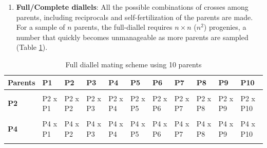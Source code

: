 \documentclass[11pt,dvipsnames,ignorenonframetext,aspectratio=169]{beamer}
\providecommand{\tightlist}{%
  \setlength{\itemsep}{0pt}\setlength{\parskip}{0pt}}
\begin{document}
\begin{frame}{}
\protect\hypertarget{section-7}{}
\begin{enumerate}
\tightlist
\item
  \textbf{Full/Complete diallels}: All the possible combinations of
  crosses among parents, including reciprocals and self-fertilization of
  the parents are made. For a sample of \(n\) parents, the full-diallel
  requires \(n \times n\) (\(n^2\)) progenies, a number that quickly
  becomes unmanageable as more parents are sampled (Table
  \ref{tab:full-diallel}).
\end{enumerate}

\begingroup\fontsize{8}{10}\selectfont

\begin{longtable}[t]{>{\raggedright\arraybackslash}p{3.0em}>{\raggedright\arraybackslash}p{3.0em}>{\raggedright\arraybackslash}p{3.0em}>{\raggedright\arraybackslash}p{3.0em}>{\raggedright\arraybackslash}p{3.0em}>{\raggedright\arraybackslash}p{3.0em}>{\raggedright\arraybackslash}p{3.0em}>{\raggedright\arraybackslash}p{3.0em}>{\raggedright\arraybackslash}p{3.0em}>{\raggedright\arraybackslash}p{3.0em}>{\raggedright\arraybackslash}p{3.5em}}
\caption{\label{tab:full-diallel}Full diallel mating scheme using 10 parents}\\
\toprule
Parents & P1 & P2 & P3 & P4 & P5 & P6 & P7 & P8 & P9 & P10\\
\midrule
\textbf{\cellcolor{gray!6}{P1}} & \cellcolor{gray!6}{P1 x P1} & \cellcolor{gray!6}{P1 x P2} & \cellcolor{gray!6}{P1 x P3} & \cellcolor{gray!6}{P1 x P4} & \cellcolor{gray!6}{P1 x P5} & \cellcolor{gray!6}{P1 x P6} & \cellcolor{gray!6}{P1 x P7} & \cellcolor{gray!6}{P1 x P8} & \cellcolor{gray!6}{P1 x P9} & \cellcolor{gray!6}{P1 x P10}\\
\textbf{P2} & P2 x P1 & P2 x P2 & P2 x P3 & P2 x P4 & P2 x P5 & P2 x P6 & P2 x P7 & P2 x P8 & P2 x P9 & P2 x P10\\
\textbf{\cellcolor{gray!6}{P3}} & \cellcolor{gray!6}{P3 x P1} & \cellcolor{gray!6}{P3 x P2} & \cellcolor{gray!6}{P3 x P3} & \cellcolor{gray!6}{P3 x P4} & \cellcolor{gray!6}{P3 x P5} & \cellcolor{gray!6}{P3 x P6} & \cellcolor{gray!6}{P3 x P7} & \cellcolor{gray!6}{P3 x P8} & \cellcolor{gray!6}{P3 x P9} & \cellcolor{gray!6}{P3 x P10}\\
\textbf{P4} & P4 x P1 & P4 x P2 & P4 x P3 & P4 x P4 & P4 x P5 & P4 x P6 & P4 x P7 & P4 x P8 & P4 x P9 & P4 x P10\\
\textbf{\cellcolor{gray!6}{P5}} & \cellcolor{gray!6}{P5 x P1} & \cellcolor{gray!6}{P5 x P2} & \cellcolor{gray!6}{P5 x P3} & \cellcolor{gray!6}{P5 x P4} & \cellcolor{gray!6}{P5 x P5} & \cellcolor{gray!6}{P5 x P6} & \cellcolor{gray!6}{P5 x P7} & \cellcolor{gray!6}{P5 x P8} & \cellcolor{gray!6}{P5 x P9} & \cellcolor{gray!6}{P5 x P10}\\

\end{longtable}
\end{frame}
\end{document}
